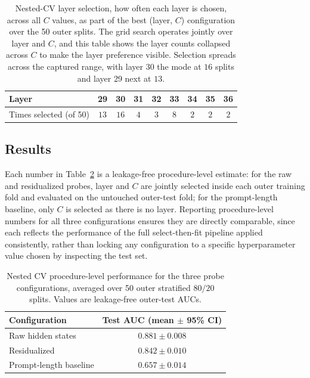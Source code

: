 \begin{table}[h]
\centering
\begin{tabular}{lcccccccc}
\toprule
Layer & 29 & 30 & 31 & 32 & 33 & 34 & 35 & 36 \\
\midrule
Times selected (of 50) & $13$ & $16$ & $4$ & $3$ & $8$ & $2$ & $2$ & $2$ \\
\bottomrule
\end{tabular}
\caption{Nested-CV layer selection, how often each layer is chosen, across all $C$ values, as part of the best (layer, $C$) configuration over the 50 outer splits. The grid search operates jointly over layer and $C$, and this table shows the layer counts collapsed across $C$ to make the layer preference visible. Selection spreads across the captured range, with layer 30 the mode at $16$ splits and layer 29 next at $13$.}
\label{tab:nested_cv_selection}
\end{table}

\FloatBarrier
\subsection{Results}

Each number in Table~\ref{tab:probe_results} is a leakage-free procedure-level estimate: for the raw and residualized probes, layer and $C$ are jointly selected inside each outer training fold and evaluated on the untouched outer-test fold; for the prompt-length baseline, only $C$ is selected as there is no layer. Reporting procedure-level numbers for all three configurations ensures they are directly comparable, since each reflects the performance of the full select-then-fit pipeline applied consistently, rather than locking any configuration to a specific hyperparameter value chosen by inspecting the test set.

\begin{table}[h]
\centering
\begin{tabular}{lc}
\toprule
Configuration & Test AUC (mean $\pm$ 95\% CI) \\
\midrule
Raw hidden states    & $0.881 \pm 0.008$ \\
Residualized         & $0.842 \pm 0.010$ \\
Prompt-length baseline & $0.657 \pm 0.014$ \\
\bottomrule
\end{tabular}
\caption{Nested CV procedure-level performance for the three probe configurations, averaged over 50 outer stratified $80/20$ splits. Values are leakage-free outer-test AUCs.}
\label{tab:probe_results}
\end{table}

